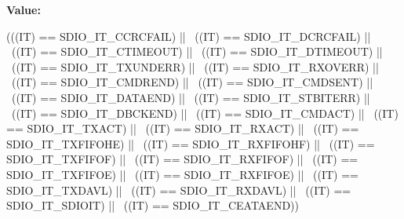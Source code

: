 \label{group__SDIO__Flags_gaef42c81f1f6250d8f9f438f4e16d1e98}
{\bfseries Value:}
\begin{DoxyCode}
(((IT)  == SDIO_IT_CCRCFAIL) || \
                            ((IT)  == SDIO_IT_DCRCFAIL) || \
                            ((IT)  == SDIO_IT_CTIMEOUT) || \
                            ((IT)  == SDIO_IT_DTIMEOUT) || \
                            ((IT)  == SDIO_IT_TXUNDERR) || \
                            ((IT)  == SDIO_IT_RXOVERR) || \
                            ((IT)  == SDIO_IT_CMDREND) || \
                            ((IT)  == SDIO_IT_CMDSENT) || \
                            ((IT)  == SDIO_IT_DATAEND) || \
                            ((IT)  == SDIO_IT_STBITERR) || \
                            ((IT)  == SDIO_IT_DBCKEND) || \
                            ((IT)  == SDIO_IT_CMDACT) || \
                            ((IT)  == SDIO_IT_TXACT) || \
                            ((IT)  == SDIO_IT_RXACT) || \
                            ((IT)  == SDIO_IT_TXFIFOHE) || \
                            ((IT)  == SDIO_IT_RXFIFOHF) || \
                            ((IT)  == SDIO_IT_TXFIFOF) || \
                            ((IT)  == SDIO_IT_RXFIFOF) || \
                            ((IT)  == SDIO_IT_TXFIFOE) || \
                            ((IT)  == SDIO_IT_RXFIFOE) || \
                            ((IT)  == SDIO_IT_TXDAVL) || \
                            ((IT)  == SDIO_IT_RXDAVL) || \
                            ((IT)  == SDIO_IT_SDIOIT) || \
                            ((IT)  == SDIO_IT_CEATAEND))
\end{DoxyCode}
